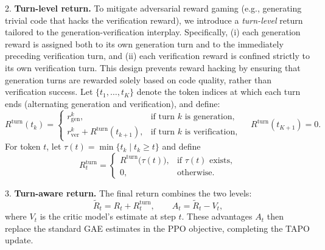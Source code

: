 \documentclass{article} %
\begin{document}
2. \textbf{Turn-level return.}  
To mitigate adversarial reward gaming (e.g., generating trivial code that hacks the verification reward), we introduce a \emph{turn-level} return tailored to the generation-verification interplay. Specifically, (i) each generation reward is assigned both to its own generation turn and to the immediately preceding verification turn, and (ii) each verification reward is confined strictly to its own verification turn. This design prevents reward hacking by ensuring that generation turns are rewarded solely based on code quality, rather than verification success. Let $\{t_1, \dots, t_K\}$ denote the token indices at which each turn ends  (alternating generation and verification), and define:
\begin{equation}
R^{\mathrm{turn}}(t_k) =
\begin{cases}
r_{\mathrm{gen}}^k, 
& \text{if turn }k\text{ is generation},\\[4pt]
r_{\mathrm{ver}}^k + R^{\mathrm{turn}}(t_{k+1}), 
& \text{if turn }k\text{ is verification},
\end{cases}
\quad
R^{\mathrm{turn}}(t_{K+1}) = 0.
\end{equation}
For token $t$, let $\tau(t)=\min\{t_k \mid t_k \ge t\}$ and define
\begin{equation}
R^{\mathrm{turn}}_t =
\begin{cases}
R^{\mathrm{turn}}\bigl(\tau(t)\bigr), & \text{if }\tau(t)\text{ exists},\\
0, & \text{otherwise}.
\end{cases}
\end{equation}

3. \textbf{Turn-aware return.}  
The final return combines the two levels:
\begin{equation}
\widetilde R_t = R_t + R^{\mathrm{turn}}_t,
\qquad
A_t = \widetilde R_t - V_t,
\end{equation}
where $V_t$ is the critic model’s estimate at step $t$. These advantages $A_t$ then replace the standard GAE estimates in the PPO objective, completing the TAPO update.  

\end{document}
